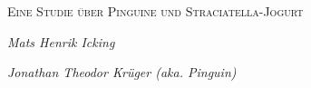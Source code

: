 \documentclass[50pt, a4paper]{article}
\begin{document}
\thispagestyle{empty}

\begin{title}
	
	\vspace{5cm}
	
	{\scshape\Huge Eine Studie \"uber Pinguine und Straciatella-Jogurt \par}

	\vspace{5cm}
	{\Large\itshape Mats Henrik Icking \par}
    {\Large\itshape Jonathan Theodor Kr\"uger (aka. Pinguin) \par}	


\end{title}


\end{document}
